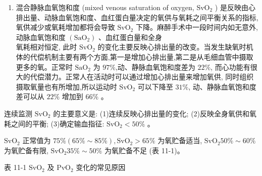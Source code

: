 \documentclass[10pt]{article}
\begin{document}
\begin{enumerate}
  \item 混合静脉血氧饱和度 (mixed venous saturation of oxygen, $\mathrm{SvO}_{2}$ ) 是反映由心排出量、动脉血氧饱和度、血红蛋白量决定的氧供与氧耗之间平衡关系的指标, 氧供减少或氧耗增加都将会导致 $\mathrm{SvO}_{2}$ 下降。麻醉手术中一段时间内如无意外,动脉血氧饱和度 $\left(\mathrm{SaO}_{2}\right)$ 、血红蛋白量和全身\\
氧耗相对恒定, 此时 $\mathrm{SvO}_{2}$ 的变化主要反映心排出量的改变。当发生缺氧时机体的代偿机制主要有两个方面,第一是增加心排出量,第二是从毛细血管中摄取更多的氧。正常时 $\mathrm{SaO}_{2}$ 为 $97 \%$,动、静脉血氧饱和度差为 $22 \%$, 而心功能有很大的代偿潜力。正常人在活动时可以通过增加心排出量来增加氧供, 同时组织摄取氧量也有所增加,所以运动时 $\mathrm{SvO}_{2}$ 可以下降至 $31 \%$, 动、静脉血氧饱和度差可以从 $22 \%$ 增加到 $66 \%$ 。

\end{enumerate}

连续监测 $\mathrm{SvO}_{2}$ 的主要意义是: (1)连续反映心排出量的变化; (2)反映全身氧供和氧耗之间的平衡; (3)确定输血指征: $\mathrm{SvO}_{2}<50 \%$ 。

$\mathrm{SvO}_{2}$ 正常值为 $75 \%(65 \% \sim 85 \%), \mathrm{SvO}_{2}>65 \%$ 为氧贮备适当, $\mathrm{SvO}_{2} 50 \% \sim 60 \%$ 为氧贮备有限, $\mathrm{SvO}_{2} 35 \% \sim 50 \%$ 为氧贮备不足 (表 11-1)。

表 11-1 $\mathrm{SvO}_{2}$ 及 $\mathrm{PvO}_{2}$ 变化的常见原因
\end{document}
